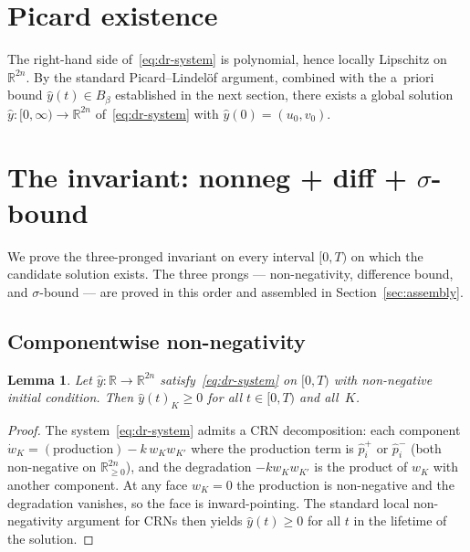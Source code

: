 \documentclass[11pt]{article}
\newtheorem{lemma}[theorem]{Lemma}
\newcommand{\R}{\mathbb{R}}
\begin{document}
\section{Picard existence}\label{sec:picard}

The right-hand side of~\eqref{eq:dr-system} is polynomial, hence locally
Lipschitz on $\R^{2n}$.  By the standard Picard--Lindel\"of argument,
combined with the a~priori bound $\widehat y(t) \in B_\beta$ established
in the next section, there exists a global solution
$\widehat y\colon [0, \infty) \to \R^{2n}$ of~\eqref{eq:dr-system} with
$\widehat y(0) = (u_0, v_0)$.

\section{The invariant: nonneg + diff + $\sigma$-bound}\label{sec:invariant}

We prove the three-pronged invariant on every interval $[0, T)$ on
which the candidate solution exists.  The three prongs --- non-negativity,
difference bound, and $\sigma$-bound --- are proved in this order and
assembled in Section~\ref{sec:assembly}.

\subsection{Componentwise non-negativity}

\begin{lemma}\label{lem:nonneg}
Let $\widehat y\colon \R \to \R^{2n}$ satisfy~\eqref{eq:dr-system} on
$[0, T)$ with non-negative initial condition.  Then $\widehat y(t)_K
\ge 0$ for all $t \in [0, T)$ and all~$K$.
\end{lemma}

\begin{proof}
The system~\eqref{eq:dr-system} admits a CRN decomposition: each
component $\dot w_K = (\text{production}) - k\, w_K w_{K'}$ where the
production term is $\widehat{p}_i^{+}$ or $\widehat{p}_i^{-}$ (both
non-negative on $\R^{2n}_{\ge 0}$), and the degradation $-k w_K w_{K'}$
is the product of $w_K$ with another component.  At any face $w_K = 0$
the production is non-negative and the degradation vanishes, so the
face is inward-pointing.  The standard local non-negativity argument
for CRNs then yields $\widehat y(t) \ge 0$ for all $t$ in the lifetime
of the solution.
\end{proof}
\end{document}
